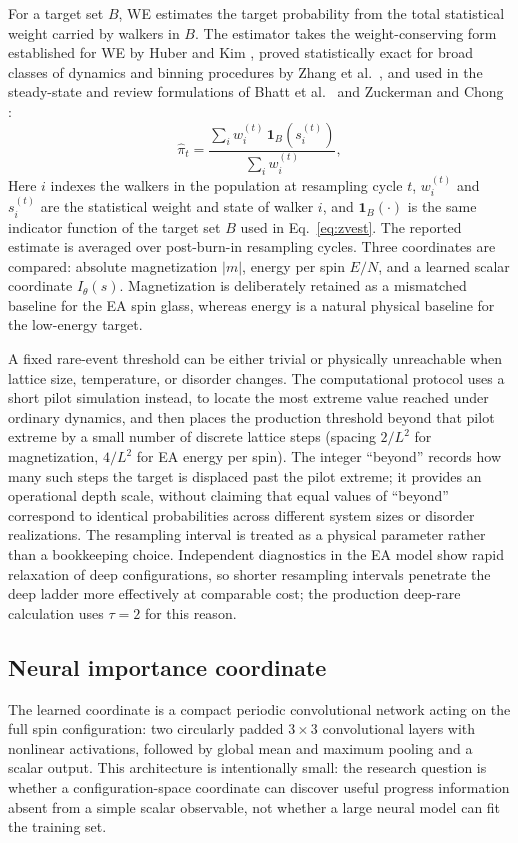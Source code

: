 \documentclass[a4paper,fleqn]{cas-sc}
\begin{document}
For a target set $B$, WE estimates the target probability from the total statistical weight
carried by walkers in $B$. The estimator takes the weight-conserving form established for WE
by Huber and Kim \citep{huber1996}, proved statistically exact for broad classes of dynamics
and binning procedures by Zhang et al.\ \citep{zhang2010}, and used in the steady-state and
review formulations of Bhatt et al.\ \citep{bhatt2010} and Zuckerman and Chong
\citep{zuckerman2017}:
\begin{equation}
\hat\pi_t=\frac{\sum_i w_i^{(t)}\,\mathbf 1_B\!\left(s_i^{(t)}\right)}{\sum_i w_i^{(t)}},
\label{eq:weest}
\end{equation}
Here $i$ indexes the walkers in the population at resampling cycle $t$, $w_i^{(t)}$ and
$s_i^{(t)}$ are the statistical weight and state of walker $i$, and $\mathbf 1_B(\cdot)$ is the
same indicator function of the target set $B$ used in Eq.~\eqref{eq:zvest}.
The reported estimate is averaged over post-burn-in resampling cycles. Three coordinates
are compared: absolute magnetization $|m|$, energy per spin $E/N$, and a learned scalar
coordinate $I_\theta(s)$. Magnetization is deliberately retained as a mismatched baseline for
the EA spin glass, whereas energy is a natural physical baseline for the low-energy target.

A fixed rare-event threshold can be either trivial or physically unreachable when lattice
size, temperature, or disorder changes. The computational protocol uses a short pilot
simulation instead, to locate the most extreme value reached under ordinary dynamics, and then
places the production threshold beyond that pilot extreme by a small number of discrete
lattice steps (spacing $2/L^2$ for magnetization, $4/L^2$ for EA energy per spin). The integer
``beyond'' records how many such steps the target is displaced past the pilot extreme; it
provides an operational depth scale, without claiming that equal values of ``beyond''
correspond to identical probabilities across different system sizes or disorder realizations.
The resampling interval is treated as a physical parameter rather than a bookkeeping choice.
Independent diagnostics in the EA model show rapid relaxation of deep configurations, so
shorter resampling intervals penetrate the deep ladder more effectively at comparable cost;
the production deep-rare calculation uses $\tau=2$ for this reason.

\subsection{Neural importance coordinate}\label{sec:neural}
The learned coordinate is a compact periodic convolutional network acting on the full spin
configuration: two circularly padded $3\times3$ convolutional layers with nonlinear
activations, followed by global mean and maximum pooling and a scalar output. This
architecture is intentionally small: the research question is whether a configuration-space
coordinate can discover useful progress information absent from a simple scalar observable,
not whether a large neural model can fit the training set.
\end{document}
